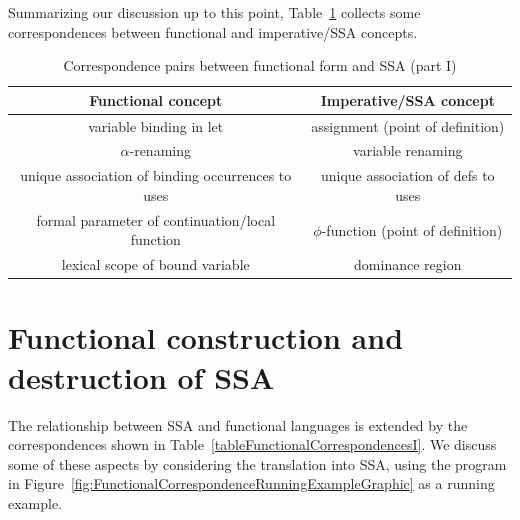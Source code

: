 Summarizing our discussion up to this point,
Table~\ref{tableFunctionalCorrespondencesZero} collects some
correspondences between functional and imperative/SSA concepts.
\begin{table}
\begin{center}
\begin{tabular}{|c|c|}
  \hline Functional concept & Imperative/SSA concept\\ 
  \hline \hline
  variable binding in let & assignment (point of definition)\\
  $\alpha$-renaming & variable renaming\\
  unique association of binding occurrences to uses & unique
  association of defs to uses\\ 
  formal parameter of continuation/local function & 
    $\phi$-function (point of definition)\\ 
  lexical scope of bound variable & dominance region\\ 
  \hline
\end{tabular}
\end{center}
\caption{\label{tableFunctionalCorrespondencesZero}
  Correspondence pairs between functional form and SSA (part I)}
\end{table}

\section{Functional construction and destruction of SSA}
\label{section:Part1:Semantics:FunctionalSSAConstruction}

The relationship between SSA and functional languages is extended by
the correspondences shown in
Table~\ref{tableFunctionalCorrespondencesI}. We discuss some of these
aspects by considering the translation into SSA, using the program in
Figure~\ref{fig:FunctionalCorrespondenceRunningExampleGraphic} as a running
example.

